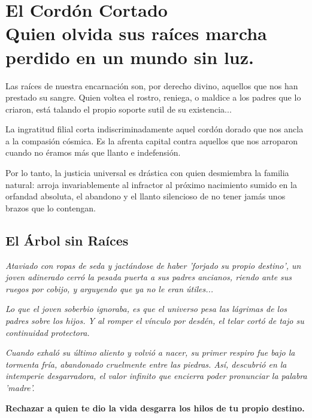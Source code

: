 \chapter[El Cordón Cortado]{El Cordón Cortado\\ \large Quien olvida sus raíces marcha perdido en un mundo sin luz.}


\lettrine[lines=3, nindent=0.5em, findent=0.2em]{L}{}as raíces de nuestra encarnación son, por derecho divino, aquellos que nos han prestado su sangre. Quien voltea el rostro, reniega, o maldice a los padres que lo criaron, está talando el propio soporte sutil de su existencia...

La ingratitud filial corta indiscriminadamente aquel cordón dorado que nos ancla a la compasión cósmica. Es la afrenta capital contra aquellos que nos arroparon cuando no éramos más que llanto e indefensión.

Por lo tanto, la justicia universal es drástica con quien desmiembra la familia natural: arroja invariablemente al infractor al próximo nacimiento sumido en la orfandad absoluta, el abandono y el llanto silencioso de no tener jamás unos brazos que lo contengan.

\section{El Árbol sin Raíces}
\begin{elegantquote}
\textit{Ataviado con ropas de seda y jactándose de haber 'forjado su propio destino', un joven adinerado cerró la pesada puerta a sus padres ancianos, riendo ante sus ruegos por cobijo, y arguyendo que ya no le eran útiles...}

\textit{Lo que el joven soberbio ignoraba, es que el universo pesa las lágrimas de los padres sobre los hijos. Y al romper el vínculo por desdén, el telar cortó de tajo su continuidad protectora.}

\textit{Cuando exhaló su último aliento y volvió a nacer, su primer respiro fue bajo la tormenta fría, abandonado cruelmente entre las piedras. Así, descubrió en la intemperie desgarradora, el valor infinito que encierra poder pronunciar la palabra 'madre'.}

\end{elegantquote}


\vspace{1em}
\begin{center}
    \textbf{\Large Rechazar a quien te dio la vida desgarra los hilos de tu propio destino.}
\end{center}
\vspace{1em}

